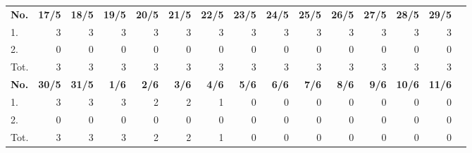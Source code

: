 \documentclass{article}
\begin{document}
\begin{table}[H]
    \centering
    \begin{tabularx}{\textwidth}{| X | r | r | r | r | r | r | r | r | r | r | r | r | r | r |}
        \Xhline{2pt}
        \textbf{No.} & \textbf{17/5} & \textbf{18/5} & \textbf{19/5} & \textbf{20/5} & \textbf{21/5} & \textbf{22/5} & \textbf{23/5} & \textbf{24/5} & \textbf{25/5} & \textbf{26/5} & \textbf{27/5} & \textbf{28/5} & \textbf{29/5} \\
        \Xhline{2pt}
        1. & 3 & 3 & 3 & 3 & 3 & 3 & 3 & 3 & 3 & 3 & 3 & 3 & 3 \\
        \hline
        2. & 0 & 0 & 0 & 0 & 0 & 0 & 0 & 0 & 0 & 0 & 0 & 0 & 0 \\
        \hline
        Tot. & 3 & 3 & 3 & 3 & 3 & 3 & 3 & 3 & 3 & 3 & 3 & 3 & 3 \\
        \Xhline{2pt}
        \textbf{No.} & \textbf{30/5} & \textbf{31/5} & \textbf{ 1/6} & \textbf{ 2/6} & \textbf{ 3/6} & \textbf{ 4/6} & \textbf{ 5/6} & \textbf{ 6/6} & \textbf{ 7/6} & \textbf{ 8/6} & \textbf{ 9/6} & \textbf{10/6} & \textbf{11/6} \\
        \Xhline{2pt}
        1. & 3 & 3 & 3 & 2 & 2 & 1 & 0 & 0 & 0 & 0 & 0 & 0 & 0 \\
        \hline
        2. & 0 & 0 & 0 & 0 & 0 & 0 & 0 & 0 & 0 & 0 & 0 & 0 & 0 \\
        \hline
        Tot. & 3 & 3 & 3 & 2 & 2 & 1 & 0 & 0 & 0 & 0 & 0 & 0 & 0 \\
        \hline
    \end{tabularx}
\end{table}
\vspace{0.5cm}
\end{document}
